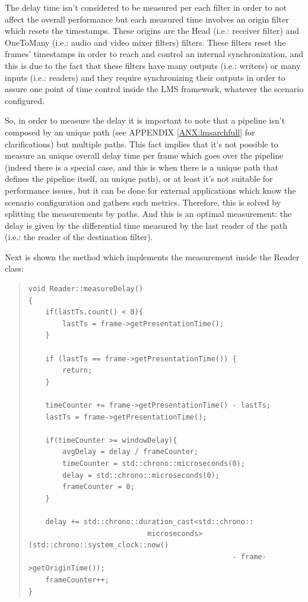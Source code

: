 The delay time isn't considered to be measured per each filter in order to not affect the overall performance but each measured time involves an origin filter which resets the timestamps. These origins are the Head (i.e.: receiver filter) and OneToMany (i.e.: audio and video mixer filters) filters. These filters reset the frames' timestamps in order to reach and control an internal synchronization, and this is due to the fact that these filters have many outputs (i.e.: writers) or many inputs (i.e.: readers) and they require synchronizing their outputs in order to assure one point of time control inside the LMS framework, whatever the scenario configured.

So, in order to measure the delay it is important to note that a pipeline isn't composed by an unique path (see APPENDIX \ref{ANX:lmsarchfull} for clarifications) but multiple paths. This fact implies that it's not possible to measure an unique overall delay time per frame which goes over the pipeline (indeed there is a special case, and this is when there is a unique path that defines the pipeline itself, an unique path), or at least it's not suitable for performance issues, but it can be done for external applications which know the scenario configuration and gathers such metrics. Therefore, this is solved by splitting the measurements by paths. And this is an optimal measurement: the delay is given by the differential time measured by the last reader of the path (i.e.: the reader of the destination filter).

Next is shown the method which implements the measurement inside the Reader class:

\begin{quote}
\begin{verbatim}
void Reader::measureDelay()
{
    if(lastTs.count() < 0){
        lastTs = frame->getPresentationTime();
    }

    if (lastTs == frame->getPresentationTime()) {
        return;
    }

    timeCounter += frame->getPresentationTime() - lastTs;
    lastTs = frame->getPresentationTime();

    if(timeCounter >= windowDelay){
        avgDelay = delay / frameCounter;
        timeCounter = std::chrono::microseconds(0);
        delay = std::chrono::microseconds(0);
        frameCounter = 0;
    }
    
    delay += std::chrono::duration_cast<std::chrono::
    						microseconds>(std::chrono::system_clock::now() 
    											- frame->getOriginTime());
    frameCounter++;
}
\end{verbatim}
\end{quote} 

